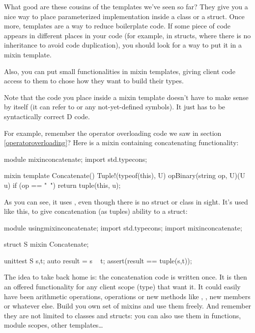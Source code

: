 What good are these cousins of the templates we've seen so far? They give you a nice way to place parameterized implementation inside a class or a struct. Once more, templates are a way to reduce boilerplate code. If some piece of code appears in different places in your code (for example, in structs, where there is no inheritance to avoid code duplication), you should look for a way to put it in a mixin template.

Also, you can put small functionalities in mixin templates, giving client code access to them to chose how they want to build their types.

Note that the code you place inside a mixin template doesn't have to make sense by itself (it can refer to  or any not-yet-defined symbols). It just has to be syntactically correct D code.

For example, remember the operator overloading code we saw in section \ref{operatoroverloading}? Here is a mixin containing concatenating functionality:

\begin{dcode}
module mixinconcatenate;
import std.typecons;

mixin template Concatenate()
{
    Tuple!(typeof(this), U) opBinary(string op, U)(U u) 
    if (op == "~")
    {
        return tuple(this, u);
    }
}
\end{dcode}

As you can see, it uses , even though there is no struct or class in sight. It's used like this, to give concatenation (as tuples) ability to a struct:

\begin{dcode}
module usingmixinconcatenate;
import std.typecons;
import mixinconcatenate;

struct S
{
    mixin Concatenate;
}

unittest
{
    S s,t;
    auto result = s ~ t;
    assert(result == tuple(s,t));
}
\end{dcode}

The idea to take back home is: the concatenation code is written once. It is then an offered functionality for any client scope (type) that want it. It could easily have been arithmetic operations,  operations or new methods like , , new members or whatever else. Build you own set of mixins and use them freely. And remember they are not limited to classes and structs: you can also use them in functions, module scopes, other templates\ldots

